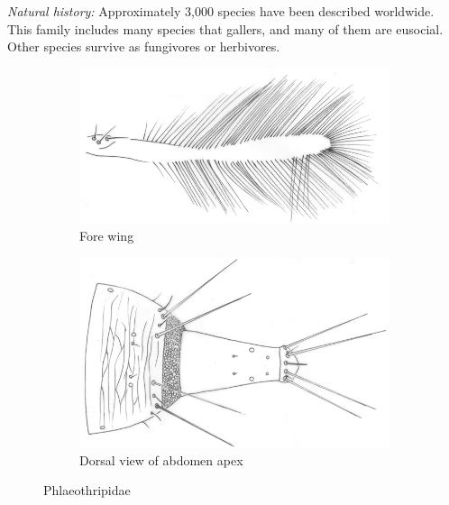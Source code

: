 \documentclass[letterpaper, 11pt]{article}
\begin{document}
\noindent{}\textit{Natural history:} Approximately 3,000 species have been described worldwide. This family includes many species that gallers, and many of them are eusocial. Other species survive as fungivores or herbivores.\\

\begin{figure}[ht!]
 \centering
 \begin{subfigure}[ht!]{0.5\textwidth}
  \includegraphics[width=\textwidth]{PhlaeothripidWing}
  \caption{Fore wing \citep[][Fig. 6]{minaei2013}}
  \label{fig:phlaeothripid1}
 \end{subfigure}
 \qquad
 \begin{subfigure}[ht!]{0.3\textwidth}
  \includegraphics[width=\textwidth]{PhlaeothripidAbdomen}
  \caption{Dorsal view of abdomen apex \citep[][Fig. 9]{minaei2013}}
  \label{fig:phlaeothripid2}
 \end{subfigure}
 \caption{Phlaeothripidae}\label{fig:phlaeothripids}
\end{figure}


\FloatBarrier
\clearpage
\end{document}
